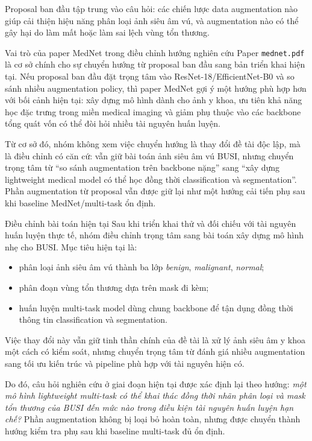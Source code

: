 \documentclass[12pt,a4paper]{article}
\begin{document}
Proposal ban đầu tập trung vào câu hỏi: các chiến lược data augmentation nào giúp cải thiện hiệu năng phân loại ảnh siêu âm vú, và augmentation nào có thể gây hại do làm mất hoặc làm sai lệch vùng tổn thương.

\begin{methodbox}{Vai trò của paper MedNet trong điều chỉnh hướng nghiên cứu}
Paper \texttt{mednet.pdf} là cơ sở chính cho sự chuyển hướng từ proposal ban đầu sang bản triển khai hiện tại. Nếu proposal ban đầu đặt trọng tâm vào ResNet-18/EfficientNet-B0 và so sánh nhiều augmentation policy, thì paper MedNet gợi ý một hướng phù hợp hơn với bối cảnh hiện tại: xây dựng mô hình dành cho ảnh y khoa, ưu tiên khả năng học đặc trưng trong miền medical imaging và giảm phụ thuộc vào các backbone tổng quát vốn có thể đòi hỏi nhiều tài nguyên huấn luyện.

Từ cơ sở đó, nhóm không xem việc chuyển hướng là thay đổi đề tài độc lập, mà là điều chỉnh có căn cứ: vẫn giữ bài toán ảnh siêu âm vú BUSI, nhưng chuyển trọng tâm từ ``so sánh augmentation trên backbone nặng'' sang ``xây dựng lightweight medical model có thể học đồng thời classification và segmentation''. Phần augmentation từ proposal vẫn được giữ lại như một hướng cải tiến phụ sau khi baseline MedNet/multi-task ổn định.
\end{methodbox}

\begin{methodbox}{Điều chỉnh bài toán hiện tại}
Sau khi triển khai thử và đối chiếu với tài nguyên huấn luyện thực tế, nhóm điều chỉnh trọng tâm sang bài toán xây dựng mô hình nhẹ cho BUSI. Mục tiêu hiện tại là:
\begin{itemize}
    \item phân loại ảnh siêu âm vú thành ba lớp \textit{benign}, \textit{malignant}, \textit{normal};
    \item phân đoạn vùng tổn thương dựa trên mask đi kèm;
    \item huấn luyện multi-task model dùng chung backbone để tận dụng đồng thời thông tin classification và segmentation.
\end{itemize}
\end{methodbox}

Việc thay đổi này vẫn giữ tinh thần chính của đề tài là xử lý ảnh siêu âm y khoa một cách có kiểm soát, nhưng chuyển trọng tâm từ đánh giá nhiều augmentation sang tối ưu kiến trúc và pipeline phù hợp với tài nguyên hiện có.

Do đó, câu hỏi nghiên cứu ở giai đoạn hiện tại được xác định lại theo hướng: \textit{một mô hình lightweight multi-task có thể khai thác đồng thời nhãn phân loại và mask tổn thương của BUSI đến mức nào trong điều kiện tài nguyên huấn luyện hạn chế?} Phần augmentation không bị loại bỏ hoàn toàn, nhưng được chuyển thành hướng kiểm tra phụ sau khi baseline multi-task đủ ổn định.
\end{document}

